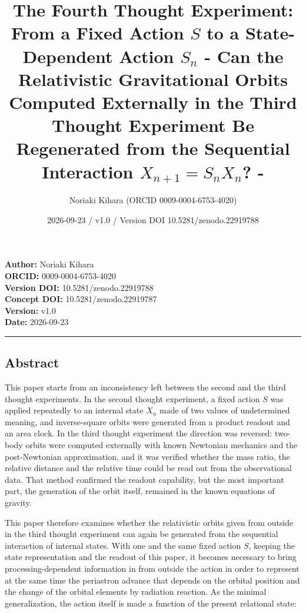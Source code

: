 \documentclass[
  a4paper,
]{article}
\title{The Fourth Thought Experiment: From a Fixed Action \(S\) to a
State-Dependent Action \(S_n\) - Can the Relativistic Gravitational
Orbits Computed Externally in the Third Thought Experiment Be
Regenerated from the Sequential Interaction \(X_{n+1}=S_nX_n\)? -}
\author{Noriaki Kihara (ORCID 0009-0004-6753-4020)}
\date{2026-09-23 / v1.0 / Version DOI 10.5281/zenodo.22919788}
\begin{document}
\maketitle

\textbf{Author:} Noriaki Kihara\\
\textbf{ORCID:} 0009-0004-6753-4020\\
\textbf{Version DOI:} 10.5281/zenodo.22919788\\
\textbf{Concept DOI:} 10.5281/zenodo.22919787\\
\textbf{Version:} v1.0\\
\textbf{Date:} 2026-09-23

\begin{center}\rule{0.5\linewidth}{0.5pt}\end{center}

\subsection{Abstract}\label{abstract}

This paper starts from an inconsistency left between the second and the
third thought experiments. In the second thought experiment, a fixed
action \(S\) was applied repeatedly to an internal state \(X_n\) made of
two values of undetermined meaning, and inverse-square orbits were
generated from a product readout and an area clock. In the third thought
experiment the direction was reversed: two-body orbits were computed
externally with known Newtonian mechanics and the post-Newtonian
approximation, and it was verified whether the mass ratio, the relative
distance and the relative time could be read out from the observational
data. That method confirmed the readout capability, but the most
important part, the generation of the orbit itself, remained in the
known equations of gravity.

This paper therefore examines whether the relativistic orbits given from
outside in the third thought experiment can again be generated from the
sequential interaction of internal states. With one and the same fixed
action \(S\), keeping the state representation and the readout of this
paper, it becomes necessary to bring processing-dependent information in
from outside the action in order to represent at the same time the
periastron advance that depends on the orbital position and the change
of the orbital elements by radiation reaction. As the minimal
generalization, the action itself is made a function of the present
relational state:
\end{document}
